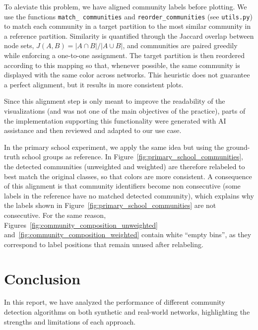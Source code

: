\documentclass{article}
\begin{document}
To aleviate this problem, we have aligned community labels before plotting. We use the functions \texttt{match\_ communities} and \texttt{reorder\_communities} (see \texttt{utils.py}) to match each community in a target partition to the most similar community in a reference partition. Similarity is quantified through the Jaccard overlap between node sets, $J(A,B)=\lvert A\cap B\rvert/\lvert A\cup B\rvert$, and communities are paired greedily while enforcing a one-to-one assignment. The target partition is then reordered according to this mapping so that, whenever possible, the same community is displayed with the same color across networks. This heuristic does not guarantee a perfect alignment, but it results in more consistent plots.

Since this alignment step is only meant to improve the readability of the visualizations (and was not one of the main objectives of the practice), parts of the implementation supporting this functionality were generated with AI assistance and then reviewed and adapted to our use case.

In the primary school experiment, we apply the same idea but using the ground-truth school groups as reference. In Figure~\ref{fig:primary_school_communities}, the detected communities (unweighted and weighted) are therefore relabeled to best match the original classes, so that colors are more consistent. A consequence of this alignment is that community identifiers become non consecutive (some labels in the reference have no matched detected community), which explains why the labels shown in Figure~\ref{fig:primary_school_communities} are not consecutive. For the same reason, Figures~\ref{fig:community_composition_unweighted} and~\ref{fig:community_composition_weighted} contain white ``empty bins'', as they correspond to label positions that remain unused after relabeling.

\section{Conclusion}

In this report, we have analyzed the performance of different community detection algorithms on both synthetic and real-world networks, highlighting the strengths and limitations of each approach.
\end{document}

